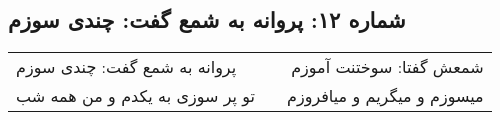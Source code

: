 \begin{center}
\section*{شماره ۱۲: پروانه به شمع گفت: چندی سوزم}
\label{sec:012}
\begin{longtable}{l p{0.5cm} r}
پروانه به شمع گفت: چندی سوزم
&&
شمعش گفتا: سوختنت آموزم
\\
تو پر سوزی به یکدم و من همه شب
&&
میسوزم و میگریم و میافروزم
\\
\end{longtable}
\end{center}

